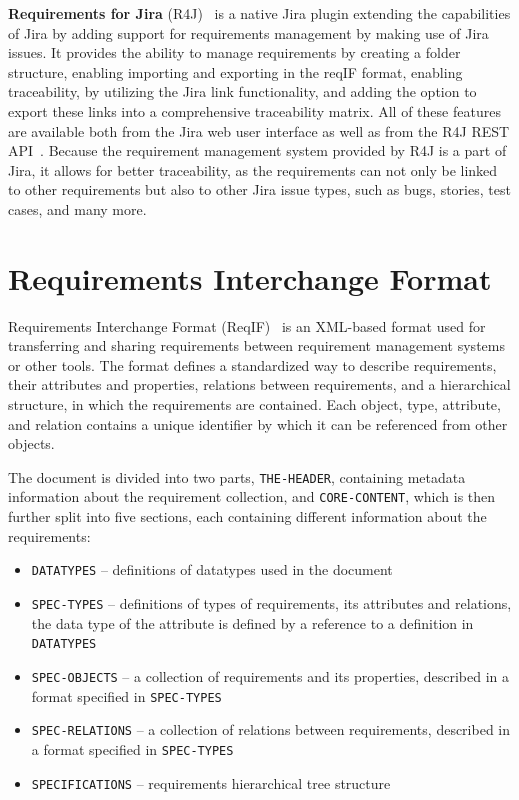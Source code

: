 \textbf{Requirements for Jira} (R4J) \cite{requirements_for_jira} is a native Jira plugin extending the capabilities of Jira by adding support for requirements management by making use of Jira issues. It provides the ability to manage requirements by creating a folder structure, enabling importing and exporting in the reqIF format, enabling traceability, by utilizing the Jira link functionality, and adding the option to export these links into a comprehensive traceability matrix. All of these features are available both from the Jira web user interface as well as from the R4J REST API \cite{r4j_api}. Because the requirement management system provided by R4J is a part of Jira, it allows for better traceability, as the requirements can not only be linked to other requirements but also to other Jira issue types, such as bugs, stories, test cases, and many more.

\section{Requirements Interchange Format}
Requirements Interchange Format (ReqIF) \cite{reqif_standard} is an XML-based format used for transferring and sharing requirements between requirement management systems or other tools. The format defines a standardized way to describe requirements, their attributes and properties, relations between requirements, and a hierarchical structure, in which the requirements are contained. Each object, type, attribute, and relation contains a unique identifier by which it can be referenced from other objects.

The document is divided into two parts, \texttt{THE-HEADER}, containing metadata information about the requirement collection, and \texttt{CORE-CONTENT}, which is then further split into five sections, each containing different information about the requirements:

\begin{itemize}
  \item \texttt{DATATYPES} -- definitions of datatypes used in the document
  \item \texttt{SPEC-TYPES} -- definitions of types of requirements, its attributes and relations, the data type of the attribute is defined by a reference to a definition in \texttt{DATATYPES}
  \item \texttt{SPEC-OBJECTS} -- a collection of requirements and its properties, described in a format specified in \texttt{SPEC-TYPES}
  \item \texttt{SPEC-RELATIONS} -- a collection of relations between requirements, described in a format specified in \texttt{SPEC-TYPES}
  \item \texttt{SPECIFICATIONS} -- requirements hierarchical tree structure
\end{itemize}

